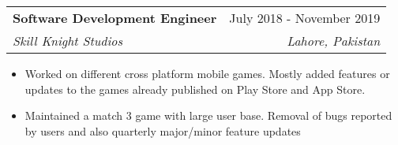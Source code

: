 \documentclass[letterpaper,11pt]{article}
\makeatletter
\newcommand{\resumeItem}[1]{
  \item\small{
    {#1 \vspace{-2pt}}
  }
}
\newcommand{\resumeSubheading}[4]{
  \vspace{-2pt}\item
    \begin{tabular*}{0.97\textwidth}[t]{l@{\extracolsep{\fill}}r}
      \textbf{#1} & #2 \\
      \textit{\small#3} & \textit{\small #4} \\
    \end{tabular*}\vspace{-7pt}
}
\newcommand{\resumeSubSubheading}[2]{
    \item
    \begin{tabular*}{0.97\textwidth}{l@{\extracolsep{\fill}}r}
      \textit{\small#1} & \textit{\small #2} \\
    \end{tabular*}\vspace{-7pt}
}
\newcommand{\resumeSubHeadingListEnd}{\end{itemize}}
\newcommand{\resumeItemListStart}{\begin{itemize}}
\newcommand{\resumeItemListEnd}{\end{itemize}\vspace{-5pt}}
\makeatother
\begin{document}
      
    \resumeSubheading
      {Software Development Engineer}{July 2018 - November 2019}
      {Skill Knight Studios}{Lahore, Pakistan}
      \resumeItemListStart
        \resumeItem{Worked on different cross platform mobile games. Mostly added features or updates to the games already published on Play Store and App Store.}
        \resumeItem{Maintained a match 3 game with large user base. Removal of bugs reported by users and also quarterly major/minor feature updates}
\resumeItemListEnd
    


      


\end{document}
